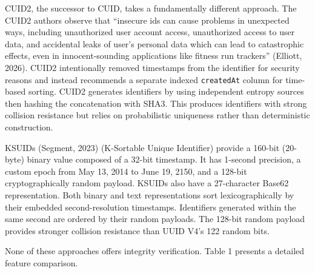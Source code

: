 \documentclass[fleqn,10pt,lineno]{wlpeerj}
\begin{document}
CUID2, the successor to CUID, takes a fundamentally different approach.
The CUID2 authors observe that ``insecure ids can cause problems in
unexpected ways, including unauthorized user account access,
unauthorized access to user data, and accidental leaks of user's
personal data which can lead to catastrophic effects, even in
innocent-sounding applications like fitness run trackers'' (Elliott,
2026). CUID2 intentionally removed timestamps from the identifier for
security reasons and instead recommends a separate indexed
\texttt{createdAt} column for time-based sorting. CUID2 generates
identifiers by using independent entropy sources then hashing the
concatenation with SHA3. This produces identifiers with strong collision
resistance but relies on probabilistic uniqueness rather than
deterministic construction.

KSUIDs (Segment, 2023) (K-Sortable Unique Identifier) provide a 160-bit
(20-byte) binary value composed of a 32-bit timestamp. It has 1-second
precision, a custom epoch from May 13, 2014 to June 19, 2150, and a
128-bit cryptographically random payload. KSUIDs also have a
27-character Base62 representation. Both binary and text representations
sort lexicographically by their embedded second-resolution timestamps.
Identifiers generated within the same second are ordered by their random
payloads. The 128-bit random payload provides stronger collision
resistance than UUID V4's 122 random bits.

None of these approaches offers integrity verification. Table 1 presents
a detailed feature comparison.
\end{document}
